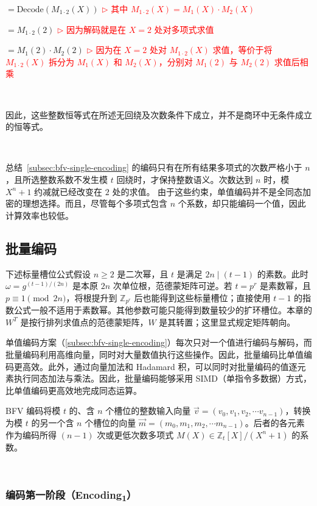 $= \text{Decode}(M_{1\cdot2}(X))$ \textcolor{red}{$\rhd$ 其中 $M_{1\cdot2}(X) = M_1(X) \cdot M_2(X)$}

$= M_{1\cdot2}(2)$ \textcolor{red}{$\rhd$ 因为解码就是在 $X = 2$ 处对多项式求值}

$= M_{1}(2) \cdot M_{2}(2)$ \textcolor{red}{$\rhd$ 因为在 $X=2$ 处对 $M_{1\cdot2}(X)$ 求值，等价于将 $M_{1\cdot2}(X)$ 拆分为 $M_{1}(X)$ 和 $M_{2}(X)$，分别对 $M_1(2)$ 与 $M_2(2)$ 求值后相乘}




$ $

因此，这些整数恒等式在所述无回绕及次数条件下成立，并不是商环中无条件成立的恒等式。

$ $

总结~\ref*{subsec:bfv-single-encoding} 的编码只有在所有结果多项式的次数严格小于 $n$，且所选整数系数不发生模 $t$ 回绕时，才保持整数语义。次数达到 $n$ 时，模 $X^n+1$ 约减就已经改变在 $2$ 处的求值。
由于这些约束，单值编码并不是全同态加密的理想选择。而且，尽管每个多项式包含 $n$ 个系数，却只能编码一个值，因此计算效率也较低。


\subsection{批量编码}
\label{subsec:bfv-batch-encoding}

下述标量槽位公式假设 $n\geq2$ 是二次幂，且 $t$ 是满足 $2n\mid(t-1)$ 的素数。此时 $\omega=g^{(t-1)/(2n)}$ 是本原 $2n$ 次单位根，范德蒙矩阵可逆。若 $t=p^r$ 是素数幂，且 $p\equiv1\pmod{2n}$，将根提升到 $\mathbb Z_{p^r}$ 后也能得到这些标量槽位；直接使用 $t-1$ 的指数公式一般不适用于素数幂。其他参数可能只能得到数量较少的扩环槽位。本章的 $W^T$ 是按行排列求值点的范德蒙矩阵，$W$ 是其转置；这里显式规定矩阵朝向。

单值编码方案（\autoref{subsec:bfv-single-encoding}）每次只对一个值进行编码与解码，而批量编码利用高维向量，同时对大量数值执行这些操作。因此，批量编码比单值编码更高效。此外，通过向量加法和 Hadamard 积，可以同时对批量编码的值逐元素执行同态加法与乘法。因此，批量编码能够采用 SIMD（单指令多数据）方式，比单值编码更高效地完成同态运算。

BFV 编码将模 $t$ 的、含 $n$ 个槽位的整数输入向量 $\vec{v} = (v_0, v_1, v_2, \cdots v_{n-1})$，转换为模 $t$ 的另一个含 $n$ 个槽位的向量 $\vec{m} = (m_0, m_1, m_2, \cdots m_{n-1})$。后者的各元素作为编码所得 $(n-1)$ 次或更低次数多项式 $M(X) \in \mathbb{Z}_t[X] / (X^n + 1)$ 的系数。

$ $

\subsubsection{编码第一阶段（\textsf{Encoding\textsubscript{1}}）}
\label{subsubsec:bfv-encoding-1} 

